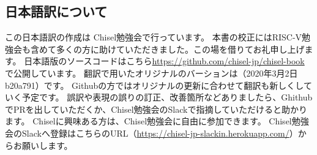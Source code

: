 \documentclass[%
    10pt,
    headinclude, footexclude,
    openright, %
    notitlepage,
    cleardoubleempty,
    headsepline,
    pointlessnumbers,
    bibtotoc, idxtotoc,
    ]{scrbook}
\newif\ifshoworiginal
\newif\ifshowtrans
\begin{document}
\begin{flushleft}
\ifshoworiginal
\section*{Acknowledgements}
\fi
\ifshowtrans %
\section*{謝辞}
\fi

\ifshoworiginal
I want to thank everyone who has worked on Chisel for creating such
a cool hardware construction language. Chisel is so joyful to use and
therefore worth writing a book about.
I am thankful to the whole Chisel community, which is so welcoming and friendly
and never tired to answer questions on Chisel.
\fi

\ifshowtrans %
クールなハードウェア構築言語であるChiselの開発に携わったすべてのみなさまに感謝します。
Chiselは使用するのがとても楽しく、その本を書く価値があります。
とてもオープンでフレンドリで、Chiselに関する質問に熱心に答えてくれる Chiselコミュニティ全体に感謝しています。
\fi

\ifshoworiginal
I would also like to thank my students in the last years of an advanced computer
architecture course where most of them picked up Chisel for the final project.
Thank you for moving out of your comfort zone and taking up the journey of
learning and using a bleeding-edge hardware description language.
Many of your questions have helped to shape this book.
\fi

\ifshowtrans %
また、最後の数年間、先進コンピュータアーキテクチャコースを受講した学生たちに感謝したいと思います。
ほとんどの生徒が最終プロジェクトのためにChiselを取り上げてくれました。
殻から抜け出し、新しい勉強の旅に出て、最先端のハードウェア記述言語を使用していただき感謝します。
あなたたちの質問の多くは、この本を形作るのに大変役立ちました。
\fi

\ifshowtrans %
\clearpage
\section*{日本語訳について}

この日本語訳の作成は Chisel勉強会で行っています。
本書の校正にはRISC-V勉強会も含めて多くの方に助けていただきました。この場を借りてお礼申し上げます。
日本語版のソースコードはこちら\url{https://github.com/chisel-jp/chisel-book} で公開しています。
翻訳で用いたオリジナルのバーションは（2020年3月2日 b20a791）です。
Githubの方ではオリジナルの更新に合わせて翻訳も新しくしていく予定です。
誤訳や表現の誤りの訂正、改善箇所などありましたら、GhithubでPRを出していただくか、Chisel勉強会のSlackで指摘していただけると助かります。
Chiselに興味ある方は、Chisel勉強会に自由に参加できます。
Chisel勉強会のSlackへ登録はこちらのURL（\url{https://chisel-jp-slackin.herokuapp.com/}）からお願いします。


\end{flushleft}
\end{document}

